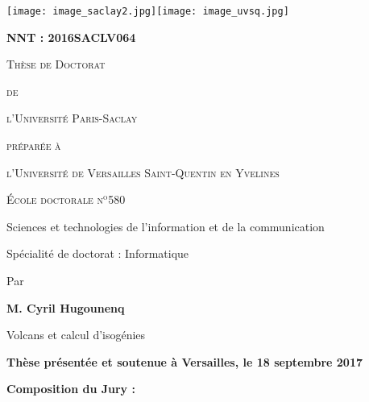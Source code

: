 \documentclass[a4paper, titlepage, 12pt]{book}
\newcommand{\titre}{Volcans et calcul d'isogénies}
\begin{document}
\frontmatter
\pagestyle{empty}

 \texttt{[image: image\_saclay2.jpg]}\hfill\texttt{[image: image\_uvsq.jpg]}
\begin{breakbox}
\textbf{NNT : 2016SACLV064}

\vspace{3cm}

\begin{center}
{\Large\textsc{Thèse de Doctorat}

\textsc{de}

\textsc{l’Université Paris-Saclay}

\textsc{préparée à}

\textsc{l’Université de Versailles Saint-Quentin en Yvelines}

}

\vspace{6ex}

{\large\textsc{École doctorale n$^\textrm{o}$580}

Sciences et technologies de l'information et de la communication

\vspace{1ex}

Spécialité de doctorat : Informatique

}

\vspace{6ex}

Par


\vspace{1ex}

{\large\textbf{M. Cyril Hugounenq}

\vspace{1ex}

\titre

}
\end{center}

\vspace{3ex}

\noindent
\textbf{Thèse présentée et soutenue à Versailles, le 18 septembre 2017}

\vspace{2ex}

\noindent
\textbf{Composition du Jury :}

\vspace{2ex}


\end{breakbox}
\end{document}
